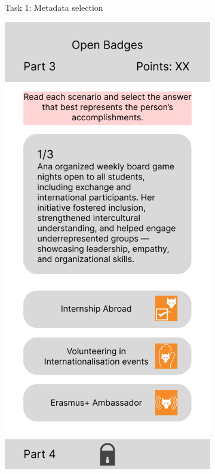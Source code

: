 \begin{figure}[H]
\begin{subfigure}[]{0.3\textwidth}
    \caption{Task 1: Metadata selection}
  \end{subfigure}
  \hfill
  \begin{subfigure}[]{0.3\textwidth}
    \includegraphics[width=\textwidth]{Media/design2.png}

\end{subfigure}
\end{figure}
